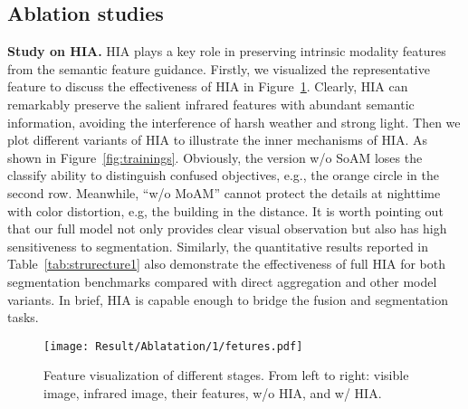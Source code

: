\documentclass[10pt,twocolumn,letterpaper]{article}
\begin{document}
\subsection{Ablation studies}
\noindent\textbf{Study on HIA.} HIA plays a key role in preserving intrinsic modality features from the semantic feature guidance. Firstly, we visualized the representative feature to discuss the effectiveness of HIA in Figure~\ref{fig:abstructure}. Clearly, HIA can remarkably preserve the salient infrared features with abundant semantic information, avoiding the interference of harsh weather and strong light. Then we plot different variants of HIA to illustrate the inner mechanisms of HIA. As shown in Figure~\ref{fig:trainings}. Obviously, the version w/o SoAM loses the classify ability to distinguish 
confused objectives, e.g., the orange circle in the second row. Meanwhile, ``w/o MoAM'' cannot protect the details at nighttime with color distortion, e.g, the building in the distance. It is worth pointing out that our full model not only provides clear visual observation but also has high sensitiveness to segmentation. Similarly, the quantitative results reported in Table~\ref{tab:strurecture1} also demonstrate the effectiveness of full HIA for both segmentation benchmarks compared with direct aggregation and other model variants. In brief, HIA is capable enough to bridge the  fusion and  segmentation tasks.
\begin{figure}[!htb]
	\centering
	\setlength{\tabcolsep}{1pt} 
	
	\texttt{[image: Result/Ablatation/1/fetures.pdf]}
	
	\caption{Feature visualization of different stages. From left to right: visible image, infrared image, their features, w/o HIA, and w/ HIA.}
	\label{fig:abstructure}
	\vspace{-0.2cm}  
\end{figure}
\end{document}
